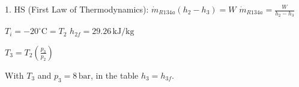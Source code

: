 1. HS (First Law of Thermodynamics):  
\( \dot{m}_{R134a} (h_2 - h_3) = W \)  
\( \dot{m}_{R134a} = \frac{W}{h_2 - h_3} \)  

\( T_i = -20^\circ \text{C} = T_2 \)  
\( h_{2f} = 29.26 \, \text{kJ/kg} \)  

\( T_3 = T_2 \left( \frac{p_3}{p_2} \right) \)  

With \( T_3 \) and \( p_3 = 8 \, \text{bar} \),  
in the table \( h_3 = h_{3f} \).